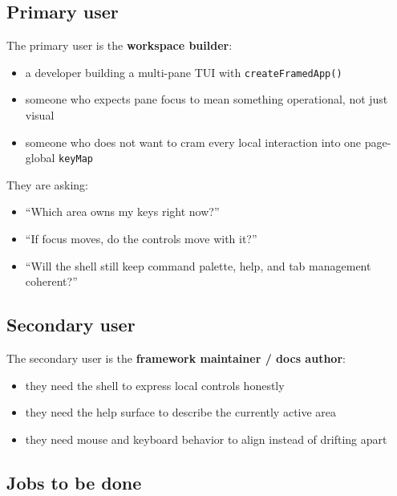 \subsection{Primary user}\label{record-044-primary-user}

The primary user is the \textbf{workspace builder}:

\begin{itemize}
\tightlist
\item
  a developer building a multi-pane TUI with \texttt{c\allowbreak{}r\allowbreak{}e\allowbreak{}a\allowbreak{}t\allowbreak{}e\allowbreak{}F\allowbreak{}r\allowbreak{}a\allowbreak{}m\allowbreak{}e\allowbreak{}d\allowbreak{}A\allowbreak{}p\allowbreak{}p\allowbreak{}(\allowbreak{})}
\item
  someone who expects pane focus to mean something operational, not just visual
\item
  someone who does not want to cram every local interaction into one page-global \texttt{k\allowbreak{}e\allowbreak{}y\allowbreak{}M\allowbreak{}a\allowbreak{}p}
\end{itemize}

They are asking:

\begin{itemize}
\tightlist
\item
  ``Which area owns my keys right now?''
\item
  ``If focus moves, do the controls move with it?''
\item
  ``Will the shell still keep command palette, help, and tab management coherent?''
\end{itemize}

\subsection{Secondary user}\label{record-044-secondary-user}

The secondary user is the \textbf{framework maintainer / docs author}:

\begin{itemize}
\tightlist
\item
  they need the shell to express local controls honestly
\item
  they need the help surface to describe the currently active area
\item
  they need mouse and keyboard behavior to align instead of drifting apart
\end{itemize}

\subsection{Jobs to be done}\label{record-044-jobs-to-be-done}

